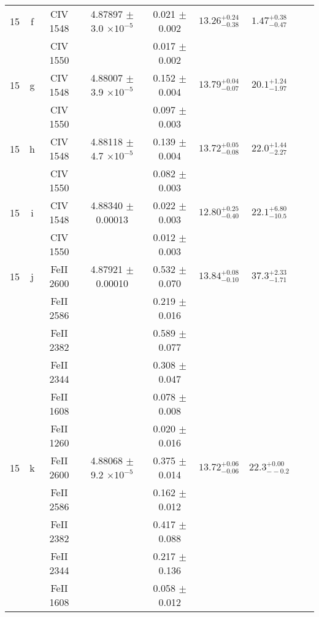 \documentclass[12pt]{article}
\begin{document}
\begin{footnotesize}
\begin{longtable}{ c c c c c c c c c}
      15  & f  & CIV     1548  &  4.87897 $\pm$ 3.0 $\times 10^{-5}$   &  0.021 $\pm$ 0.002   & $13.26_{ - 0.38}^{ + 0.24}$  & $1.47_{ - 0.47}^{ + 0.38}$    & 	 & \\ 
  &   & CIV     1550  &  &  0.017 $\pm$ 0.002   &   &     & 	 & \\ 
      15  & g  & CIV     1548  &  4.88007 $\pm$ 3.9 $\times 10^{-5}$   &  0.152 $\pm$ 0.004   & $13.79_{ - 0.07}^{ + 0.04}$  & $20.1_{ - 1.97}^{ + 1.24}$    & 	 & \\ 
  &   & CIV     1550  &  &  0.097 $\pm$ 0.003   &   &     & 	 & \\ 
      15  & h  & CIV     1548  &  4.88118 $\pm$ 4.7 $\times 10^{-5}$   &  0.139 $\pm$ 0.004   & $13.72_{ - 0.08}^{ + 0.05}$  & $22.0_{ - 2.27}^{ + 1.44}$    & 	 & \\ 
  &   & CIV     1550  &  &  0.082 $\pm$ 0.003   &   &     & 	 & \\ 
      15  & i  & CIV     1548  &  4.88340 $\pm$ 0.00013  &  0.022 $\pm$ 0.003   & $12.80_{ - 0.40}^{ + 0.25}$  & $22.1_{ - 10.5}^{ + 6.80}$    & 	 & \\ 
  &   & CIV     1550  &  &  0.012 $\pm$ 0.003   &   &     & 	 & \\ 
      15  & j  & FeII     2600  &  4.87921 $\pm$ 0.00010  &  0.532 $\pm$ 0.070   & $13.84_{ - 0.10}^{ + 0.08}$  & $37.3_{ - 1.71}^{ + 2.33}$    & 	 & \\ 
  &   & FeII     2586  &  &  0.219 $\pm$ 0.016   &   &     & 	 & \\ 
  &   & FeII     2382  &  &  0.589 $\pm$ 0.077   &   &     & 	 & \\ 
  &   & FeII     2344  &  &  0.308 $\pm$ 0.047   &   &     & 	 & \\ 
  &   & FeII     1608  &  &  0.078 $\pm$ 0.008   &   &     & 	 & \\ 
  &   & FeII     1260  &  &  0.020 $\pm$ 0.016   &   &     & 	 & \\ 
      15  & k  & FeII     2600  &  4.88068 $\pm$ 9.2 $\times 10^{-5}$   &  0.375 $\pm$ 0.014   & $13.72_{ - 0.06}^{ + 0.06}$  & $22.3_{ - -0.2}^{ + 0.00}$    & 	 & \\ 
  &   & FeII     2586  &  &  0.162 $\pm$ 0.012   &   &     & 	 & \\ 
  &   & FeII     2382  &  &  0.417 $\pm$ 0.088   &   &     & 	 & \\ 
  &   & FeII     2344  &  &  0.217 $\pm$ 0.136   &   &     & 	 & \\ 
  &   & FeII     1608  &  &  0.058 $\pm$ 0.012   &   &     & 	 & \\ 

\end{longtable}
\end{footnotesize}
\end{document}
